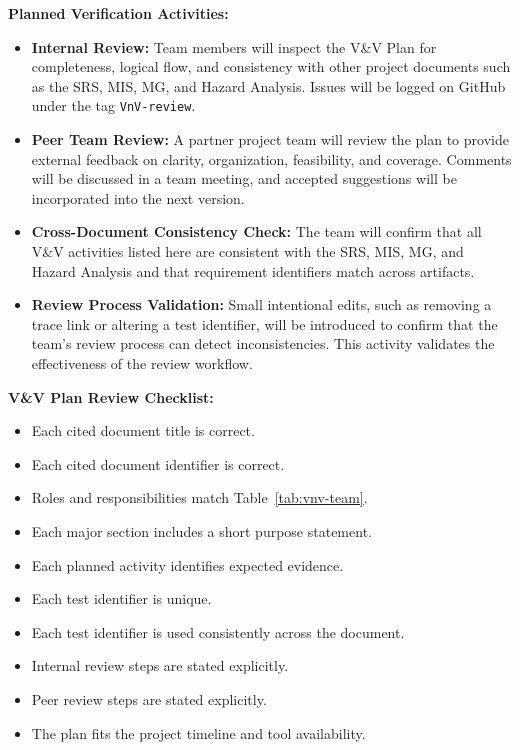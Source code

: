 \documentclass[12pt, titlepage]{article}
\begin{document}
\vspace{0.5em}
\noindent\textbf{Planned Verification Activities:}
\begin{itemize}
\item \textbf{Internal Review:}
  Team members will inspect the V\&V Plan for completeness, logical flow, and
  consistency with other project documents such as the SRS, MIS, MG, and
  Hazard Analysis. Issues will be logged on GitHub under the tag
  \texttt{VnV-review}.

\item \textbf{Peer Team Review:}
  A partner project team will review the plan to provide external feedback on
  clarity, organization, feasibility, and coverage. Comments will be
  discussed in a team meeting, and accepted suggestions will be incorporated
  into the next version.

\item \textbf{Cross-Document Consistency Check:}
  The team will confirm that all V\&V activities listed here are consistent
  with the SRS, MIS, MG, and Hazard Analysis and that requirement identifiers
  match across artifacts.

\item \textbf{Review Process Validation:}
  Small intentional edits, such as removing a trace link or altering a test
  identifier, will be introduced to confirm that the team's review process
  can detect inconsistencies. This activity validates the effectiveness of
  the review workflow.
\end{itemize}

\vspace{0.5em}
\noindent\textbf{V\&V Plan Review Checklist:}
\begin{itemize}
\item Each cited document title is correct.
\item Each cited document identifier is correct.
\item Roles and responsibilities match Table~\ref{tab:vnv-team}.
\item Each major section includes a short purpose statement.
\item Each planned activity identifies expected evidence.
\item Each test identifier is unique.
\item Each test identifier is used consistently across the document.
\item Internal review steps are stated explicitly.
\item Peer review steps are stated explicitly.
\item The plan fits the project timeline and tool availability.
\end{itemize}
\end{document}
